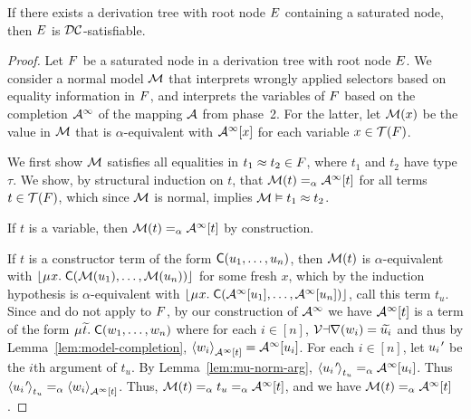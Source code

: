 \begin{theorem}%
\label{thm:ss}%
\afterDot
If there exists a derivation tree with root node $\Ec$ containing a saturated node, then $\Ec$ is $\thD$-satisfiable.
\end{theorem}
\begin{proof}
Let $\Fc$ be a saturated node in a derivation tree with root node $\Ec$.
We consider a normal model $\M$
that interprets wrongly applied selectors based on equality information in $\Fc$,
and interprets the variables of $\Fc$ based on the completion $\Val^\AST$ of the mapping $\Val$ from phase~2.
For the latter, let $\M( x )$ be the value in $\M$ that is $\alpha$-equivalent with $\Val^\AST \ec{x}$ for each variable $x \in \mathcal{T}(\Fc)$.

We first show $\M$ satisfies all equalities in $t_1 \teq t_2 \in \Fc$, where $t_1$ and $t_2$ have type $\tau$.
We show,
by structural induction on $t$,
that $\M( t ) \aequiv \Val^\AST \ec{t}$ for all terms $t \in \mathcal{T}( \Fc )$,
which since $\M$ is normal, implies $\M \models t_1 \teq t_2$.

If $t$ is a variable, then $\M( t ) \vsim \Val^\AST \ec{ t }$ by construction.

If $t$ is a constructor term of the form $\const{C}( u_1, \ldots, u_n )$,
then $\M( t )$ is $\alpha$-equivalent with $\nf{\MU x.\; \const{C}( \M( u_1 ), \ldots, \M( u_n ) ) }$ for some fresh $x$,
which by the induction hypothesis is $\alpha$-equivalent with $\nf{\MU x.\; \const{C}( \Val^\AST \ec{ u_1 }, \ldots, \Val^\AST \ec{ u_n } )}$, call this term $t_u$.
Since  and  do not apply to $\Fc$, 
by our construction of $\Val^\AST$ we have $\Val^\AST \ec{t}$ is a term
of the form $\MU {\Varec{t}}.\; \const{C}( w_1, \ldots, w_n )$ 
where for each $i \in [n]$, 
$\muvar(w_i) = {\Varec{u_i}}$ and thus by Lemma~\ref{lem:model-completion}, 
$\interp{\Val^\AST \ec{t}}{w_i} = \Val^\AST \ec{u_i}$.
For each $i \in [n]$, let $u_\iPrime$ be the $i$\vvthinspace th argument of $t_u$.
By Lemma~\ref{lem:mu-norm-arg}, $\interp{t_u}{u_\iPrime} \vsim \Val^\AST \ec{u_i}$.
Thus $\interp{t_u}{u_\iPrime} \vsim \interp{\Val^\AST \ec{t}}{ w_i }$. %
Thus, $\M( t ) \vsim t_u \vsim \Val^\AST \ec{t}$, and
we have $\M( t ) \vsim \Val^\AST \ec{t}$.


\end{proof}

